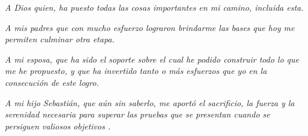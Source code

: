 \begin{dedication}
\vspace*{2in}

{\it A Dios quien, ha puesto todas las cosas importantes en mi camino, incluida esta.}

{\it A mis padres que con mucho esfuerzo lograron brindarme las bases que hoy me permiten culminar otra etapa.}

{\it A mi esposa, que ha sido el soporte sobre el cual he podido construir todo lo que me he propuesto, y que ha invertido tanto o m\'as esfuerzos que yo en la consecuci\'on de este logro.}

{\it A mi hijo Sebasti\'an, que a\'un sin saberlo, me aport\'o el sacrificio, la fuerza y la serenidad necesaria para superar las pruebas que se presentan cuando se persiguen valiosos objetivos .}


\end{dedication}